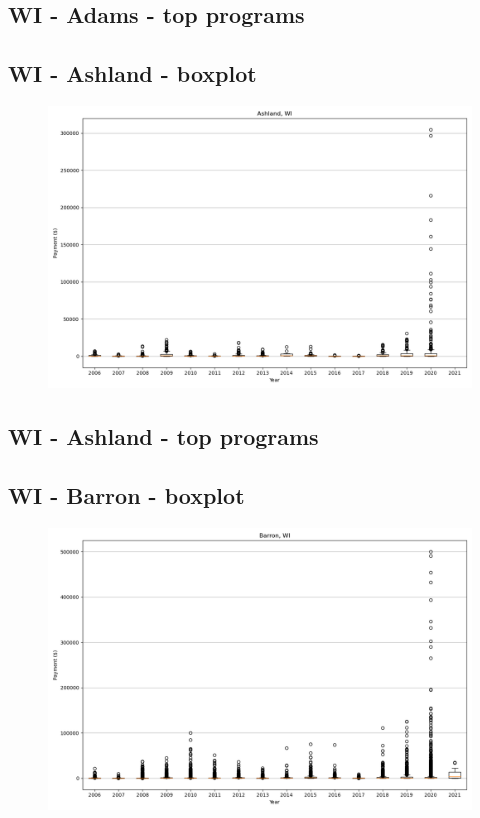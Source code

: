 \subsection*{WI - Adams - top programs}

\newpage
\subsection*{WI - Ashland - boxplot}
\begin{figure}[h]
\centering
\includegraphics[width=7in]{../output/boxplots/counties/Ashland-WI_boxplot.png}
\end{figure}


\subsection*{WI - Ashland - top programs}

\newpage
\subsection*{WI - Barron - boxplot}
\begin{figure}[h]
\centering
\includegraphics[width=7in]{../output/boxplots/counties/Barron-WI_boxplot.png}
\end{figure}


